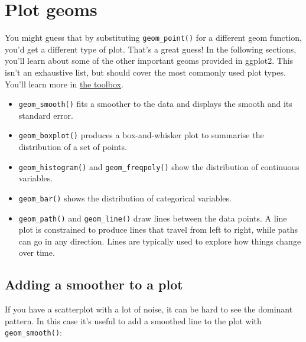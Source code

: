 \hypertarget{sec:plot-geoms}{%
\section{Plot geoms}\label{sec:plot-geoms}}

You might guess that by substituting \texttt{geom\_point()} for a
different geom function, you'd get a different type of plot. That's a
great guess! In the following sections, you'll learn about some of the
other important geoms provided in ggplot2. This isn't an exhaustive
list, but should cover the most commonly used plot types. You'll learn
more in \protect\hyperlink{cha:toolbox}{the toolbox}.

\begin{itemize}
\item
  \texttt{geom\_smooth()} fits a smoother to the data and displays the
  smooth and its standard error.
\item
  \texttt{geom\_boxplot()} produces a box-and-whisker plot to summarise
  the distribution of a set of points.
\item
  \texttt{geom\_histogram()} and \texttt{geom\_freqpoly()} show the
  distribution of continuous variables.
\item
  \texttt{geom\_bar()} shows the distribution of categorical variables.
\item
  \texttt{geom\_path()} and \texttt{geom\_line()} draw lines between the
  data points. A line plot is constrained to produce lines that travel
  from left to right, while paths can go in any direction. Lines are
  typically used to explore how things change over time.
\end{itemize}

\hypertarget{sub:smooth}{%
\subsection{Adding a smoother to a plot}\label{sub:smooth}}

If you have a scatterplot with a lot of noise, it can be hard to see the
dominant pattern. In this case it's useful to add a smoothed line to the
plot with \texttt{geom\_smooth()}: 

\begin{Shaded}
\begin{Highlighting}[]
\OperatorTok{+}\StringTok{ }
\StringTok{  }\NormalTok{() }\OperatorTok{+}\StringTok{ }
\StringTok{  }\NormalTok{()}
\end{Highlighting}
\end{Shaded}

